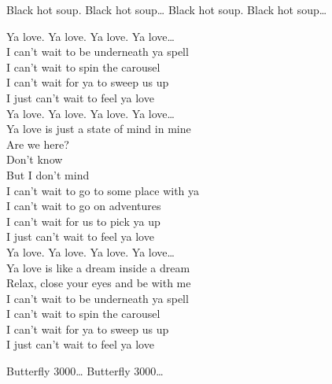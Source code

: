 Black hot soup. Black hot soup… Black hot soup. Black hot soup… \\




Ya love. Ya love. Ya love. Ya love… \\

I can't wait to be underneath ya spell \\
I can't wait to spin the carousel \\
I can't wait for ya to sweep us up \\
I just can't wait to feel ya love \\

Ya love. Ya love. Ya love. Ya love… \\

Ya love is just a state of mind in mine \\
Are we here? \\
Don't know \\
But I don't mind \\

I can't wait to go to some place with ya \\
I can't wait to go on adventures \\
I can't wait for us to pick ya up \\
I just can't wait to feel ya love \\

Ya love. Ya love. Ya love. Ya love… \\

Ya love is like a dream inside a dream \\
Relax, close your eyes and be with me \\

I can't wait to be underneath ya spell \\
I can't wait to spin the carousel \\
I can't wait for ya to sweep us up \\
I just can't wait to feel ya love \\




Butterfly 3000… Butterfly 3000… \\

